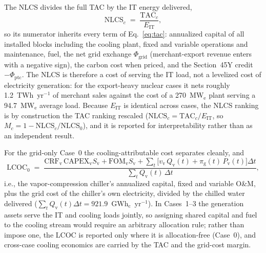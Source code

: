 The NLCS divides the full TAC by the IT energy delivered,
\begin{equation}
\label{eq:nlcs}
\mathrm{NLCS}_c \;=\; \frac{\mathrm{TAC}_c}{E_\mathrm{IT}},
\end{equation}
so its numerator inherits every term of Eq.~\eqref{eq:tac}: annualized capital of all installed blocks including the cooling plant, fixed and variable operations and maintenance, fuel, the net grid exchange $\Phi_\mathrm{grid}$ (merchant-export revenue enters with a negative sign), the carbon cost when priced, and the Section~45Y credit $-\Phi_\mathrm{ptc}$. The NLCS is therefore a cost of serving the IT load, not a levelized cost of electricity generation: for the export-heavy nuclear cases it nets roughly 1.2~TWh~yr$^{-1}$ of merchant sales against the cost of a 270~MW$_\mathrm{e}$ plant serving a 94.7~MW$_\mathrm{e}$ average load. Because $E_\mathrm{IT}$ is identical across cases, the NLCS ranking is by construction the TAC ranking rescaled ($\mathrm{NLCS}_c = \mathrm{TAC}_c/E_\mathrm{IT}$, so $M_c = 1-\mathrm{NLCS}_c/\mathrm{NLCS}_0$), and it is reported for interpretability rather than as an independent result.

For the grid-only Case~0 the cooling-attributable cost separates cleanly, and
\begin{equation}
\label{eq:lcoc}
\mathrm{LCOC}_0 \;=\; \frac{\mathrm{CRF}_\mathrm{v}\,\mathrm{CAPEX}_\mathrm{v} S_\mathrm{v} + \mathrm{FOM}_\mathrm{v} S_\mathrm{v} + \sum_t \big[v_\mathrm{v}\, Q_\mathrm{v}(t) + \pi_\mathrm{g}(t)\, P_\mathrm{v}(t)\big]\Delta t}{\sum_t Q_\mathrm{v}(t)\,\Delta t},
\end{equation}
i.e., the vapor-compression chiller's annualized capital, fixed and variable O\&M, plus the grid cost of the chiller's own electricity, divided by the chilled water delivered ($\sum_t Q_\mathrm{v}(t)\Delta t = 921.9$~GWh$_\mathrm{c}$~yr$^{-1}$). In Cases~1--3 the generation assets serve the IT and cooling loads jointly, so assigning shared capital and fuel to the cooling stream would require an arbitrary allocation rule; rather than impose one, the LCOC is reported only where it is allocation-free (Case~0), and cross-case cooling economics are carried by the TAC and the grid-cost margin.

